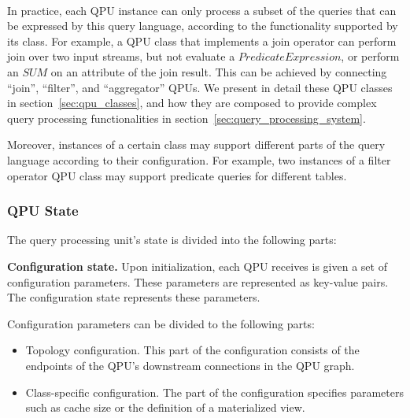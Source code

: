 ~ \bigskip

\noindent
In practice, each QPU instance can only process a subset of the queries that can be expressed by this query language,
according to the functionality supported by its class.
For example, a QPU class that implements a join operator can perform join over two input streams,
but not evaluate a $PredicateExpression$, or perform an $SUM$ on an attribute of the join result.
This can be achieved by connecting ``join'', ``filter'', and ``aggregator'' QPUs.
We present in detail these QPU classes in section~\ref{sec:qpu_classes},
and how they are composed to provide complex query processing functionalities in section~\ref{sec:query_processing_system}.

Moreover, instances of a certain class may support different parts of the query language according to their
configuration.
For example, two instances of a filter operator QPU class may support predicate queries for different tables.

\subsubsection{QPU State}

The query processing unit's state is divided into the following parts:

\medskip
\noindent
\textbf{Configuration state.}
Upon initialization, each QPU receives is given a set of configuration parameters.
These parameters are represented as key-value pairs.
The configuration state represents these parameters.

Configuration parameters can be divided to the following parts:
\begin{itemize}
  \item Topology configuration.
  This part of the configuration consists of the endpoints of the QPU's downstream connections in the QPU graph.

  \item Class-specific configuration.
  The part of the configuration specifies parameters such as cache size or the definition of a materialized view.
\end{itemize}


